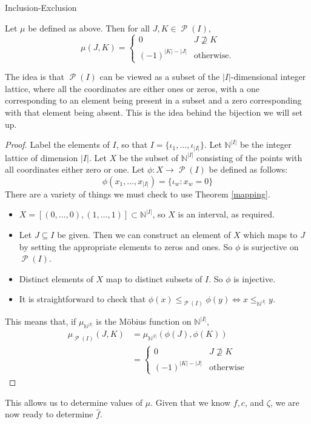\documentclass[12pt]{pom_thesis}
\DeclareMathOperator{\ps}{\mathscr{P}}
\newcommand{\Nn}{\mathbb{N}}
\begin{document}
\begin{chapter}{Inclusion-Exclusion}
\begin{thm}
Let $\mu$ be defined as above. Then for all $J, K \in \ps(I)$,
\[
\mu(J,K) = 
\begin{cases}
0 & J \not\supseteq K\\
(-1)^{|K|-|J|} & \text{otherwise}.
\end{cases}
\]
\end{thm}
The idea is that $\ps(I)$ can be viewed as a subset of the $|I|$-dimensional integer lattice, where all the coordinates are either ones or zeros, with a one corresponding to an element being present in a subset and a zero corresponding with that element being absent. This is the idea behind the bijection we will set up.
\begin{proof}
Label the elements of $I$, so that $I = \{\iota_1, \dots, \iota_{|I|}\}$. Let $\Nn^{|I|}$ be the integer lattice of dimension $|I|$. Let $X$ be the subset of $\Nn^{|I|}$ consisting of the points with all coordinates either zero or one. Let $\phi:X \rightarrow \ps(I)$ be defined as follows:
\[
\phi(x_1, \dots, x_{|I|}) = \{\iota_w : x_w = 0\}
\]
There are a variety of things we must check to use Theorem \ref{mapping}.
\begin{itemize}
\item $X = [(0,\dots,0), (1,\dots,1)] \subset \Nn^{|I|}$, so $X$ is an interval, as required.
\item Let $J \subseteq I$ be given. Then we can construct an element of $X$ which maps to $J$ by setting the appropriate elements to zeros and ones. So $\phi$ is surjective on $\ps(I)$. 
\item Distinct elements of $X$ map to distinct subsets of $I$. So $\phi$ is injective. 
\item It is straightforward to check that $\phi(x) \leq_{\ps(I)} \phi(y) \iff x \leq_{\Nn^{|I|}} y$.
\end{itemize}
This means that, if $\mu_{\Nn^{|I|}}$ is the M\"obius function on $\Nn^{|I|}$, \begin{align*}
\mu_{\ps(I)}(J,K) &= \mu_{\Nn^{|I|}}(\phi(J), \phi(K)) \\
&= \begin{cases}
0 & J \not\supseteq K\\
(-1)^{|K|-|J|} & \text{otherwise}
\end{cases}
\end{align*}
\end{proof}
This allows us to determine values of $\mu$. Given that we know $f, c$, and $\zeta$, we are now ready to determine $\hat{f}$.


\end{chapter}
\end{document}
